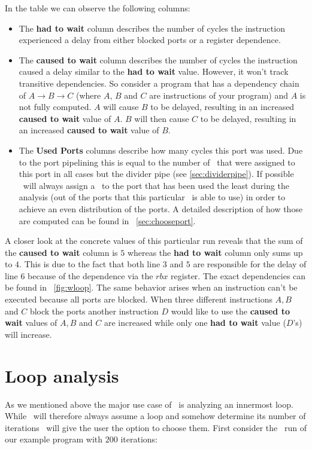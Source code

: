 In the table we can observe the following columns:
\begin{itemize}
    \item The \textbf{had to wait} column describes the number of cycles the instruction experienced a delay from either blocked ports or a register dependence. 
    \item The \textbf{caused to wait} column describes the number of cycles the instruction caused a delay similar to the \textbf{had to wait} value. However, it won't track transitive dependencies. So consider a program that has a dependency chain of $A \rightarrow B \rightarrow C$ (where $A$, $B$ and $C$ are instructions of your program) and $A$ is not fully computed. $A$ will cause $B$ to be delayed, resulting in an increased \textbf{caused to wait} value of $A$. $B$ will then cause $C$ to be delayed, resulting in an increased \textbf{caused to wait} value of $B$.
    \item The \textbf{Used Ports} columns describe how many cycles this port was used. Due to the port pipelining this is equal to the number of \microops\ that were assigned to this port in all cases but the divider pipe (see \autoref{sec:dividerpipe}). If possible \suaca\ will always assign a \microop\ to the port that has been used the least during the analysis (out of the ports that this particular \microop\ is able to use) in order to achieve an even distribution of the ports. A detailed description of how those are computed can be found in ~\autoref{sec:chooseport}.
\end{itemize}

A closer look at the concrete values of this particular run reveals that the sum of the \textbf{caused to wait} column is $5$ whereas the \textbf{had to wait} column only sums up to $4$. This is due to the fact that both line $3$ and $5$ are responsible for the delay of line $6$ because of the dependence via the $rbx$ register. The exact dependencies can be found in ~\autoref{fig:wloop}. The same behavior arises when an instruction can't be executed because all ports are blocked. When three different instructions $A, B$ and $C$ block the ports another instruction $D$ would like to use the \textbf{caused to wait} values of $A, B$ and $C$ are increased while only one \textbf{had to wait} value ($D$'s) will increase.




\section{Loop analysis}
\label{sec:loop}
As we mentioned above the major use case of \iaca\ is analyzing an innermost loop. While \iaca\ will therefore always assume a loop and somehow determine its number of iterations \suaca\ will give the user the option to choose them. First consider the \suaca\ run of our example program with $200$ iterations:

